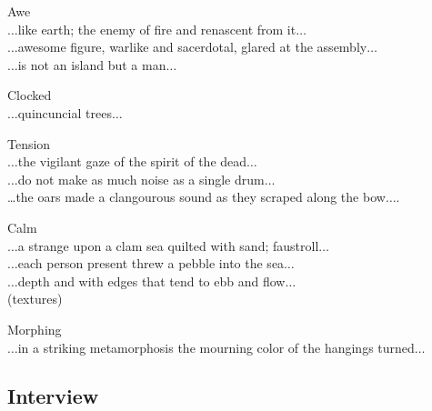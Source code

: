 Awe\\
$\ldots$like earth; the enemy of fire and renascent from it$\ldots$\\
$\ldots$awesome figure, warlike and sacerdotal, glared at the assembly$\ldots$\\
$\ldots$is not an island but a man$\ldots$

Clocked\\
$\ldots$quincuncial trees$\ldots$

Tension\\
$\ldots$the vigilant gaze of the spirit of the dead$\ldots$\\
$\ldots$do not make as much noise as a single drum$\ldots$\\
…the oars made a clangourous sound as they scraped along the bow$\ldots$.

Calm\\
$\ldots$a strange upon a clam sea quilted with sand; faustroll$\ldots$\\
$\ldots$each person present threw a pebble into the sea$\ldots$\\
$\ldots$depth and with edges that tend to ebb and flow$\ldots$\\
(textures)

Morphing\\
$\ldots$in a striking metamorphosis the mourning color of the hangings turned$\ldots$

\subsection{Interview}
